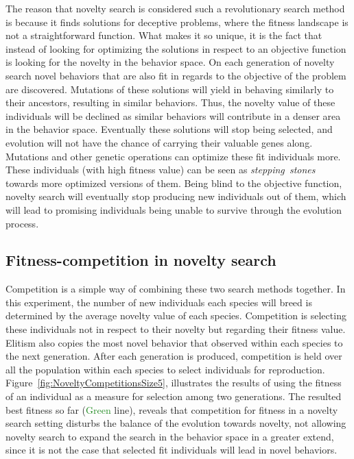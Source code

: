 The reason that novelty search is considered such a revolutionary search method is because it finds solutions for deceptive problems, where the fitness landscape is not a straightforward function. What makes it so unique, it is the fact that instead of looking for optimizing the solutions in respect to an objective function is looking for the novelty in the behavior space. On each generation of novelty search novel behaviors that are also fit in regards to the objective of the problem are discovered. Mutations of these solutions will yield in behaving similarly to their ancestors, resulting in similar behaviors. Thus, the novelty value of these individuals will be declined as similar behaviors will contribute in a denser area in the behavior space. Eventually these solutions will stop being selected, and evolution will not have the chance of carrying their valuable genes along. Mutations and other genetic operations can optimize these fit individuals more. These individuals (with high fitness value) can be seen as \emph{stepping~stones}~\citep{lehman2011abandoning} towards more optimized versions of them. Being blind to the objective function, novelty search will eventually stop producing new individuals out of them, which will lead to promising individuals being unable to survive through the evolution process.

\subsection*{Fitness-competition in novelty search}


Competition is a simple way of combining these two search methods together. In this experiment, the number of new individuals each species will breed is determined by the average novelty value of each species. Competition is selecting these individuals not in respect to their novelty but regarding their fitness value. Elitism also copies the most novel behavior that observed within each species to the next generation. After each generation is produced, competition is held over all the population within each species to select individuals for reproduction. Figure~\ref{fig:NoveltyCompetitionsSize5}, illustrates the results of using the fitness of an individual as a measure for selection among two generations. The resulted best fitness so far (\textcolor{ForestGreen}{Green} line), reveals that competition for fitness in a novelty search setting disturbs the balance of the evolution towards novelty, not allowing novelty search to expand the search in the behavior space in a greater extend, since it is not the case that selected fit individuals will lead in novel behaviors. 


